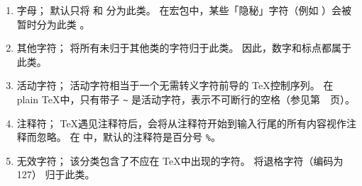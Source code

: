 \documentclass{book}
\begin{document}
\begin{enumerate}
\item{}\label{ini:let}字母；
        \IniTeX 默认只将  和  分为此类。
        在宏包中，某些「隐秘」字符（例如 ）会被暂时分为此类%
        。
\item{}\label{ini:other}其他字符；
        \IniTeX 将所有未归于其他类的字符归于此类。
        因此，数字和标点都属于此类。
\item{}活动字符；
        活动字符相当于一个无需转义字符前导的 \TeX 控制序列。
        在 plain \TeX 中，只有带子 \verb_~_ 是活动字符，表示不可断行的空格（参见第~\pageref{tie}~页）。
\item{}\label{ini:comm}注释符；
        \TeX 遇见注释符后，会将从注释符开始到输入行尾的所有内容视作注释而忽略。
        在 \IniTeX 中，默认的注释符是百分号 \verb-%-。
\item{}\label{ini:invalid}无效字符；
        该分类包含了不应在 \TeX 中出现的字符。
        \IniTeX 将退格字符（\ascii 编码为 127） 归于此类。
\end{enumerate}
\end{document}
